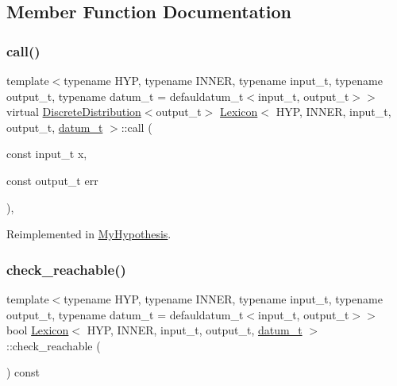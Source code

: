 \subsection{Member Function Documentation}
\mbox{\label{class_lexicon_afc6b762f68c6033a501ce7ca04b01ece}} 
\subsubsection{\texorpdfstring{call()}{call()}}
{\footnotesize\ttfamily template$<$typename H\+YP, typename I\+N\+N\+ER, typename input\+\_\+t, typename output\+\_\+t, typename datum\+\_\+t = defauldatum\+\_\+t$<$input\+\_\+t, output\+\_\+t$>$$>$ \\
virtual \hyperlink{class_discrete_distribution}{Discrete\+Distribution}$<$output\+\_\+t$>$ \hyperlink{class_lexicon}{Lexicon}$<$ H\+YP, I\+N\+N\+ER, input\+\_\+t, output\+\_\+t, \hyperlink{class_bayesable_a9f1a6c0cd7855550fa10b1a8f13a5867}{datum\+\_\+t} $>$\+::call (\begin{DoxyParamCaption}\item[{const input\+\_\+t}]{x,  }\item[{const output\+\_\+t}]{err }\end{DoxyParamCaption})\hspace{0.3cm}{\ttfamily [inline]}, {\ttfamily [virtual]}}



Reimplemented in \hyperlink{class_my_hypothesis_a61391d3f1f6fbbe37663b22e2068ac90}{My\+Hypothesis}.

\mbox{\label{class_lexicon_a1e58bf42fb2388eff629bc899d8ef5ed}} 
\subsubsection{\texorpdfstring{check\+\_\+reachable()}{check\_reachable()}}
{\footnotesize\ttfamily template$<$typename H\+YP, typename I\+N\+N\+ER, typename input\+\_\+t, typename output\+\_\+t, typename datum\+\_\+t = defauldatum\+\_\+t$<$input\+\_\+t, output\+\_\+t$>$$>$ \\
bool \hyperlink{class_lexicon}{Lexicon}$<$ H\+YP, I\+N\+N\+ER, input\+\_\+t, output\+\_\+t, \hyperlink{class_bayesable_a9f1a6c0cd7855550fa10b1a8f13a5867}{datum\+\_\+t} $>$\+::check\+\_\+reachable (\begin{DoxyParamCaption}{ }\end{DoxyParamCaption}) const\hspace{0.3cm}{\ttfamily [inline]}}

